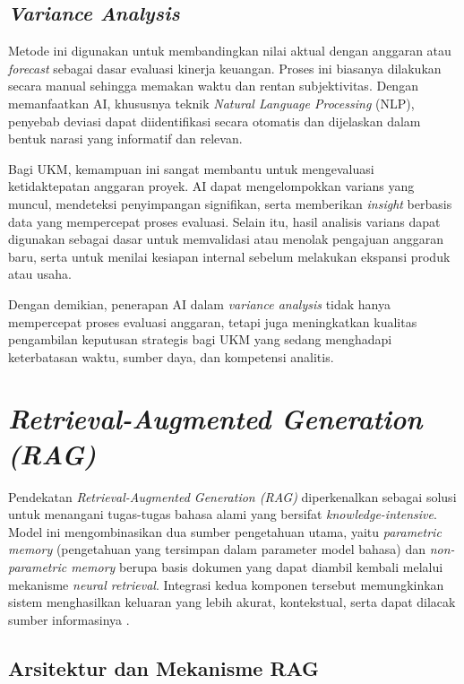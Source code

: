\subsection{\textit{Variance Analysis}}
Metode ini digunakan untuk membandingkan nilai aktual dengan anggaran atau \textit{forecast} sebagai dasar evaluasi kinerja keuangan. Proses ini biasanya dilakukan secara manual sehingga memakan waktu dan rentan subjektivitas. Dengan memanfaatkan AI, khususnya teknik \textit{Natural Language Processing} (NLP), penyebab deviasi dapat diidentifikasi secara otomatis dan dijelaskan dalam bentuk narasi yang informatif dan relevan.

Bagi UKM, kemampuan ini sangat membantu untuk mengevaluasi ketidaktepatan anggaran proyek. AI dapat mengelompokkan varians yang muncul, mendeteksi penyimpangan signifikan, serta memberikan \textit{insight} berbasis data yang mempercepat proses evaluasi. Selain itu, hasil analisis varians dapat digunakan sebagai dasar untuk memvalidasi atau menolak pengajuan anggaran baru, serta untuk menilai kesiapan internal sebelum melakukan ekspansi produk atau usaha.

Dengan demikian, penerapan AI dalam \textit{variance analysis} tidak hanya mempercepat proses evaluasi anggaran, tetapi juga meningkatkan kualitas pengambilan keputusan strategis bagi UKM yang sedang menghadapi keterbatasan waktu, sumber daya, dan kompetensi analitis.

\section{\textit{Retrieval-Augmented Generation (RAG)}}
Pendekatan \textit{Retrieval-Augmented Generation (RAG)} diperkenalkan sebagai solusi untuk menangani tugas-tugas bahasa alami yang bersifat \textit{knowledge-intensive}. Model ini mengombinasikan dua sumber pengetahuan utama, yaitu \textit{parametric memory} (pengetahuan yang tersimpan dalam parameter model bahasa) dan \textit{non-parametric memory} berupa basis dokumen yang dapat diambil kembali melalui mekanisme \textit{neural retrieval}. Integrasi kedua komponen tersebut memungkinkan sistem menghasilkan keluaran yang lebih akurat, kontekstual, serta dapat dilacak sumber informasinya \autocite{lewis2020}.

\subsection{Arsitektur dan Mekanisme RAG}

